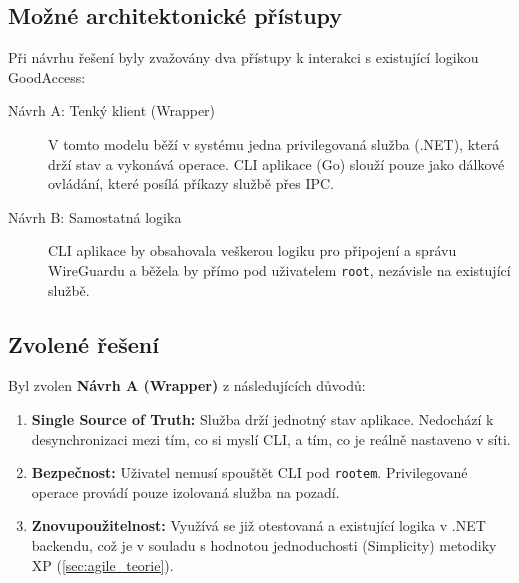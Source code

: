 \subsection{Možné architektonické přístupy}
Při návrhu řešení byly zvažovány dva přístupy k interakci s existující logikou GoodAccess:

\begin{description}
    \item[Návrh A: Tenký klient (Wrapper)] V tomto modelu běží v systému jedna privilegovaná služba (.NET), která drží stav a vykonává operace. CLI aplikace (Go) slouží pouze jako dálkové ovládání, které posílá příkazy službě přes IPC.
    \item[Návrh B: Samostatná logika] CLI aplikace by obsahovala veškerou logiku pro připojení a správu WireGuardu a běžela by přímo pod uživatelem \texttt{root}, nezávisle na existující službě.
\end{description}

\subsection{Zvolené řešení}
Byl zvolen \textbf{Návrh A (Wrapper)} z následujících důvodů:
\begin{enumerate}
    \item \textbf{Single Source of Truth:} Služba drží jednotný stav aplikace. Nedochází k desynchronizaci mezi tím, co si myslí CLI, a tím, co je reálně nastaveno v síti.
    \item \textbf{Bezpečnost:} Uživatel nemusí spouštět CLI pod \texttt{rootem}. Privilegované operace provádí pouze izolovaná služba na pozadí.
    \item \textbf{Znovupoužitelnost:} Využívá se již otestovaná a existující logika v .NET backendu, což je v souladu s hodnotou jednoduchosti (Simplicity) metodiky XP (\ref{sec:agile_teorie}).
\end{enumerate}

